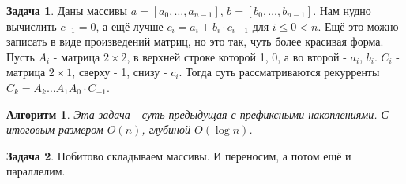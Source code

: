 \documentclass[a4paper]{article}
\theoremstyle{indented}
\newtheorem{alg}{Алгоритм}
\theoremstyle{definition}
\newtheorem{prob}{Задача}
\theoremstyle{remark}
\begin{document}
\begin{prob}
    Даны массивы $a=[a_0, \ldots, a_{n-1}]$, $b=[b_0, \ldots, b_{n-1}]$. Нам нудно вычислить $c_{-1}=0$, а ещё лучше $c_i=a_i+b_i\cdot c_{i-1}$ для $i\leq 0 < n$. Ещё это можно записать в виде произведений матриц, но это так, чуть более красивая форма. Пусть $A_i$ - матрица $2 \times 2$, в верхней строке которой 1, 0, а во второй - $a_i$, $b_i$. $C_i$ - матрица $2 \times 1$, сверху - 1, снизу - $c_i$. Тогда суть рассматриваются рекурренты $C_k=A_k\ldots A_1A_0\cdot C_{-1}$. 
\end{prob}

\begin{alg}
    Эта задача - суть предыдущая с префиксными накоплениями. С итоговым размером $O(n)$, глубиной $O(\log n)$. 
\end{alg}

\begin{prob}
    Побитово складываем массивы. И переносим, а потом ещё и параллелим.
\end{prob}
\end{document}
